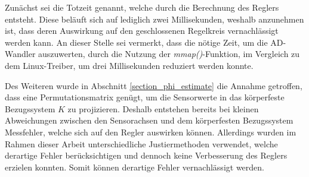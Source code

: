 Zunächst sei die Totzeit genannt, welche durch die Berechnung des Reglers entsteht. Diese beläuft sich auf lediglich zwei Millisekunden, weshalb anzunehmen ist, dass deren Auswirkung auf den geschlossenen Regelkreis vernachlässigt werden kann. An dieser Stelle sei vermerkt, dass die nötige Zeit, um die AD-Wandler auszuwerten, durch die Nutzung der \textit{mmap()}-Funktion, im Vergleich zu dem Linux-Treiber, um drei Millisekunden reduziert werden konnte. 

Des Weiteren wurde in Abschnitt \ref{section_phi_estimate} die Annahme getroffen, dass eine Permutationsmatrix genügt, um die Sensorwerte in das körperfeste Bezugssystem $K$ zu projizieren. Deshalb entstehen bereits bei kleinen Abweichungen zwischen den Sensorachsen und dem körperfesten Bezugssystem Messfehler, welche sich auf den Regler auswirken können. Allerdings wurden im Rahmen dieser Arbeit unterschiedliche Justiermethoden verwendet, welche derartige Fehler berücksichtigen und dennoch keine Verbesserung des Reglers erzielen konnten. Somit können derartige Fehler vernachlässigt werden. 

